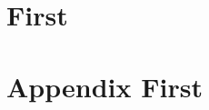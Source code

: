 \documentclass{ctexbook}
\begin{document}
\tableofcontents
\chapter{First}
\appendix
\chapter{Appendix First}
\end{document}
